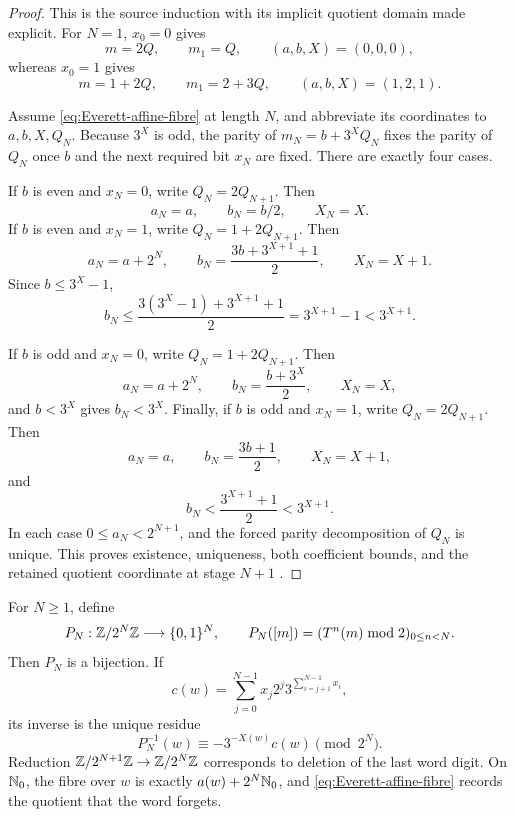 \begin{proof}
This is the source induction with its implicit quotient domain made explicit.
For \(N=1\), \(x_0=0\) gives
\[
 m=2Q,\qquad m_1=Q,\qquad (a,b,X)=(0,0,0),
\]
whereas \(x_0=1\) gives
\[
 m=1+2Q,\qquad m_1=2+3Q,\qquad (a,b,X)=(1,2,1).
\]

Assume \eqref{eq:Everett-affine-fibre} at length \(N\), and abbreviate its
coordinates to \(a,b,X,Q_N\).  Because \(3^X\) is odd, the parity of
\(m_N=b+3^XQ_N\) fixes the parity of \(Q_N\) once \(b\) and the next required
bit \(x_N\) are fixed.  There are exactly four cases.

If \(b\) is even and \(x_N=0\), write \(Q_N=2Q_{N+1}\).  Then
\[
 a_N=a,\qquad b_N=b/2,\qquad X_N=X.
\]
If \(b\) is even and \(x_N=1\), write \(Q_N=1+2Q_{N+1}\).  Then
\[
 a_N=a+2^N,\qquad
 b_N=\frac{3b+3^{X+1}+1}{2},\qquad X_N=X+1.
\]
Since \(b\le3^X-1\),
\[
 b_N\le
 \frac{3(3^X-1)+3^{X+1}+1}{2}
 =3^{X+1}-1<3^{X+1}.
\]

If \(b\) is odd and \(x_N=0\), write \(Q_N=1+2Q_{N+1}\).  Then
\[
 a_N=a+2^N,\qquad
 b_N=\frac{b+3^X}{2},\qquad X_N=X,
\]
and \(b<3^X\) gives \(b_N<3^X\).  Finally, if \(b\) is odd and
\(x_N=1\), write \(Q_N=2Q_{N+1}\).  Then
\[
 a_N=a,\qquad
 b_N=\frac{3b+1}{2},\qquad X_N=X+1,
\]
and
\[
 b_N<\frac{3^{X+1}+1}{2}<3^{X+1}.
\]
In each case \(0\le a_N<2^{N+1}\), and the forced parity decomposition of
\(Q_N\) is unique.  This proves existence, uniqueness, both coefficient
bounds, and the retained quotient coordinate at stage \(N+1\)
\cite[pp.~43--44, Eq.~(4) and proof]{Everett1977}.
\end{proof}

\begin{proposition}
\label{prop:Everett-finite-parity-morphism}
For \(N\ge1\), define
\begin{equation}
\label{eq:Everett-PN}
 P_N:\mathbb{Z}/2^N\mathbb{Z}\longrightarrow\{0,1\}^N,
 \qquad
 P_N([m])=(T^n(m)\bmod2)_{0\le n<N}.
\end{equation}
Then \(P_N\) is a bijection.  If
\[
 c(w)=\sum_{j=0}^{N-1}x_j2^j
       3^{\sum_{i=j+1}^{N-1}x_i},
\]
its inverse is the unique residue
\begin{equation}
\label{eq:Everett-inverse-residue}
 P_N^{-1}(w)\equiv-3^{-X(w)}c(w)\pmod{2^N}.
\end{equation}
Reduction \(\mathbb{Z}/2^{N+1}\mathbb{Z}\to\mathbb{Z}/2^N\mathbb{Z}\) corresponds to deletion of the last
word digit.  On \(\mathbb{N}_{0}\), the fibre over \(w\) is exactly
\(a(w)+2^N\mathbb{N}_{0}\), and \eqref{eq:Everett-affine-fibre} records the quotient
that the word forgets.
\end{proposition}

